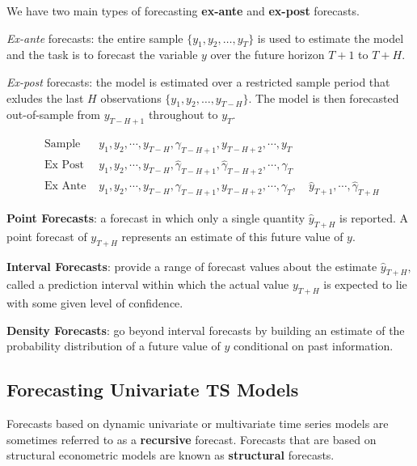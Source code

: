 \documentclass[11pt]{article}
\begin{document}
We have two main types of forecasting \textbf{ex-ante} and \textbf{ex-post} forecasts.

\textit{Ex-ante} forecasts: the entire sample $\{y_1,y_2,\ldots,y_T\}$ is used to estimate the model and the task is to forecast the variable $y$ over the future horizon $T+1$ to $T+H$.

\textit{Ex-post} forecasts: the model is estimated over a restricted sample period that exludes the last $H$ observations $\{y_1,y_2, \ldots, y_{T-H}\}$. The model is then forecasted out-of-sample from $y_{T-H+1}$ throughout to $y_T$.

\begin{equation}
\begin{array}{ll}
\text { Sample } & y_1, y_2, \cdots, y_{T-H}, \gamma_{T-H+1}, y_{T-H+2}, \cdots, y_T \\
\text { Ex Post } & y_1, y_2, \cdots, y_{T-H}, \widehat{\gamma}_{T-H+1}, \widehat{\gamma}_{T-H+2}, \cdots, \widehat{\gamma}_T \\
\text { Ex Ante } & y_1, y_2, \cdots, y_{T-H}, \gamma_{T-H+1}, y_{T-H+2}, \cdots, \gamma_T, \quad \widehat{y}_{T+1}, \cdots, \widehat{\gamma}_{T+H}
\end{array}
\end{equation}

\begin{definition}
    \textbf{Point Forecasts}: a forecast in which only a single quantity $\hat{y}_{T+H}$ is reported. A point forecast of $y_{T+H}$ represents an estimate of this future value of $y$.
\end{definition}
\begin{definition}
    \textbf{Interval Forecasts}: provide a range of forecast values about the estimate $\hat{y}_{T+H},$ called a prediction interval within which the actual value $y_{T+H}$ is expected to lie with some given level of confidence.
\end{definition}
\begin{definition}
    \textbf{Density Forecasts}: go beyond interval forecasts by building an estimate of the probability distribution of a future value of $y$ conditional on past information.
\end{definition}



\subsection{Forecasting Univariate TS Models}
Forecasts based on dynamic univariate or multivariate time series models are sometimes referred to as a \textbf{recursive} forecast. Forecasts that are based on structural econometric models are known as \textbf{structural} forecasts.
\end{document}
